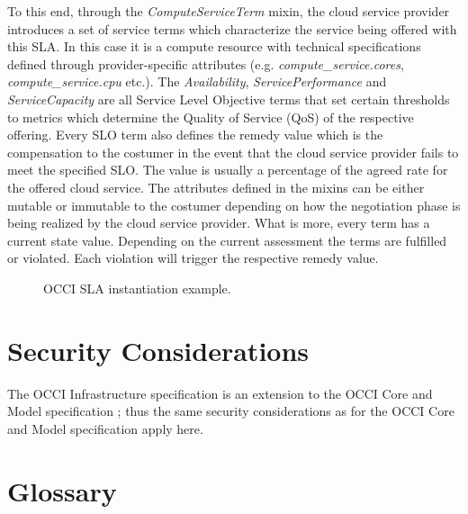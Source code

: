 \documentclass[10pt,a4paper]{article}
\begin{document}
To this end, through the \textit{ComputeServiceTerm} mixin, the cloud service provider introduces a set of service terms which characterize the service being offered with this SLA. In this case it is a compute resource with technical specifications defined through provider-specific attributes (e.g. \textit{compute\_service.cores}, \textit{compute\_service.cpu} etc.). The \textit{Availability}, \textit{ServicePerformance} and \textit{ServiceCapacity} are all Service Level Objective terms that set certain thresholds to metrics which determine the Quality of Service (QoS) of the respective offering. Every SLO term also defines the remedy value which is the compensation to the costumer in the event that the cloud service provider fails to meet the specified SLO. The value is usually a percentage of the agreed rate for the offered cloud service. The attributes defined in the mixins can be either mutable or immutable to the costumer depending on how the negotiation phase is being realized by the cloud service provider. What is more, every term has a current state value. Depending on the current assessment the terms are fulfilled or violated. Each violation will trigger the respective remedy value. 

\begin{figure}[!h]
	{\centering {} \par}
	\caption{OCCI SLA instantiation example.}
	\label{fig:occi-slas-example}
\end{figure}




\section{Security Considerations}
The OCCI Infrastructure specification is an extension to the OCCI Core
and Model specification \cite{occi:core}; thus the same security
considerations as for the OCCI Core and Model specification apply
here.

\section{Glossary}
\label{sec:glossary}
%
\end{document}
